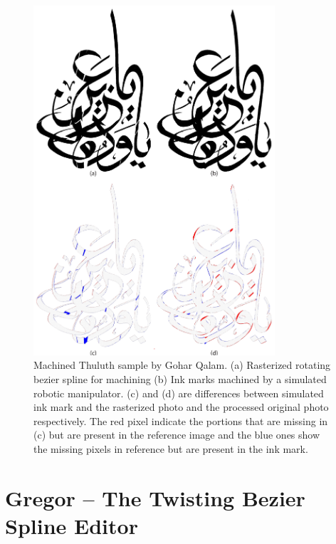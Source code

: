 {\begin{figure}[H]
  \centering
  \includegraphics[width=0.8\textwidth]{../Images/Thuluth_Machined.pdf}
  \caption
  {
      Machined Thuluth sample by Gohar Qalam. (a) Rasterized rotating bezier spline for machining (b) Ink marks machined by a simulated robotic manipulator. (c) and (d) are differences between simulated ink mark and the rasterized photo and the processed original photo respectively. The red pixel indicate the portions that are missing in (c) but are present in the reference image and the blue ones show the missing pixels in reference but are present in the ink mark.
  }
\end{figure}
}
\section{Gregor -- The Twisting Bezier Spline Editor}\label{Chapter:Gregor}
